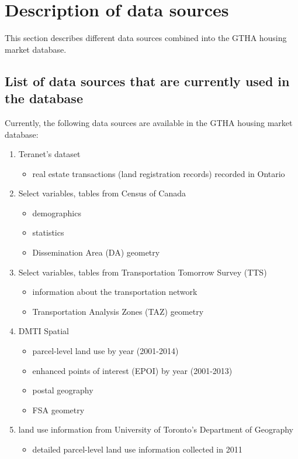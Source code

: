 \section{Description of data sources} \label{sec:description_of_data_sources}

This section describes different data sources combined into the GTHA housing market database.

\subsection{List of data sources that are currently used in the database} \label{subsec:list_of_data_sources}

Currently, the following data sources are available in the GTHA housing market database:

\begin{enumerate}
    \item Teranet's dataset
    \begin{itemize}
        \item real estate transactions (land registration records) recorded in Ontario
    \end{itemize}
    \item Select variables, tables from Census of Canada
    \begin{itemize}
        \item demographics
        \item statistics
        \item Dissemination Area (DA) geometry
    \end{itemize}
    \item Select variables, tables from Transportation Tomorrow Survey (TTS)
    \begin{itemize}
        \item information about the transportation network
        \item Transportation Analysis Zones (TAZ) geometry
    \end{itemize}
    \item DMTI Spatial
    \begin{itemize}
        \item parcel-level land use by year (2001-2014)
        \item enhanced points of interest (EPOI) by year (2001-2013)
        \item postal geography
        \item FSA geometry
    \end{itemize}
    \item land use information from University of Toronto's Department of Geography
    \begin{itemize}
        \item detailed parcel-level land use information collected in 2011
    \end{itemize}
\end{enumerate}

